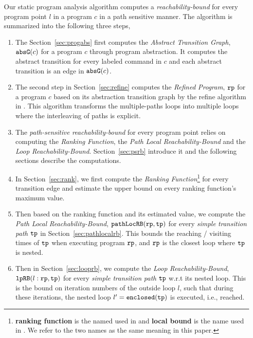 Our static program analysis algorithm computes 
a \emph{reachability-bound} for every program point $l$ in a program $c$ in a path sensitive manner.
The algorithm is summarized into the following three steps,
\begin{enumerate}
\item  The Section~\ref{sec:progabs} first 
computes the \emph{Abstract Transition Graph}, $\mathtt{abs}{\mathtt{G}}(c)$ for a program $c$ through program abstraction.
It computes the abstract transition 
for every labeled command in $c$ and each abstract transition is an edge in $\mathtt{abs}{\mathtt{G}}(c)$.
\item The second step in Section~\ref{sec:refine}
computes the \emph{Refined Program}, $\mathtt{rp}$ for a program $c$ based on 
its abstraction transition graph by the refine algorithm in \cite{GulwaniJK09}.
This algorithm transforms the multiple-paths loops
into multiple loops where
the interleaving of paths is explicit.
\item The \emph{path-sensitive reachability-bound} for every program point relies on computing the \emph{Ranking Function}, the \emph{Path Local Reachability-Bound} and the \emph{Loop Reachability-Bound}.
Section~\ref{sec:psrb} introduce it and the following sections describe the computations. 
    \item In Section~\ref{sec:rank}, we first compute the \emph{Ranking Function}\footnote{\textbf{ranking function} is the named used in \cite{SinnZV14}
    and \textbf{local bound} is the name used in \cite{ZulegerGSV11, SinnZV17}.
    We refer to the two names as the same meaning in this paper.}  for every transition edge 
    and estimate the upper bound on every ranking function's maximum value.
    \item Then based on the ranking function and its estimated value, we compute the \emph{Path Local Reachability-Bound}, $\mathtt{pathLocRB}(\mathtt{rp}, \mathtt{tp})$ for every \emph{simple transition path} $\mathtt{tp}$ in Section~\ref{sec:pathlocalrb}. 
    This bounds the reaching / visiting times of $\mathtt{tp}$ when executing program $\mathtt{rp}$, and $\mathtt{rp}$ is the closest loop where $\mathtt{tp}$ is nested.
    \item Then in Section~\ref{sec:looprb}, we compute the \emph{Loop Reachability-Bound}, $\mathtt{lpRB}(l: \mathtt{rp}, \mathtt{tp})$ for every \emph{simple transition path} $\mathtt{tp}$
    w.r.t its nested loop. 
    This is the bound on iteration numbers of the outside loop $l$,
    such that during these iterations, the nested loop $l' = \mathtt{enclosed(\mathtt{tp})}$ is executed, i.e., reached.

\end{enumerate}

